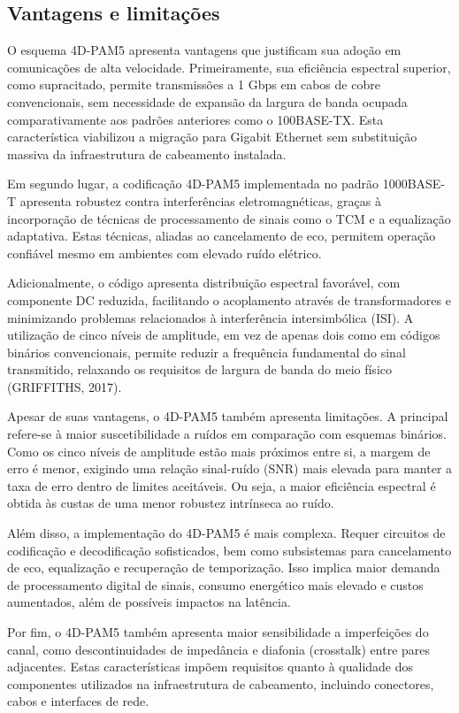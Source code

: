 \documentclass[conference]{IEEEtran}
\begin{document}
\subsection{Vantagens e limitações}

O esquema 4D-PAM5 apresenta vantagens que justificam sua adoção em comunicações de alta velocidade. Primeiramente, sua eficiência espectral superior, como supracitado, permite transmissões a 1 Gbps em cabos de cobre convencionais, sem necessidade de expansão da largura de banda ocupada comparativamente aos padrões anteriores como o 100BASE-TX. Esta característica viabilizou a migração para Gigabit Ethernet sem substituição massiva da infraestrutura de cabeamento instalada.

Em segundo lugar, a codificação 4D-PAM5 implementada no padrão 1000BASE-T apresenta robustez contra interferências eletromagnéticas, graças à incorporação de técnicas de processamento de sinais como o TCM e a equalização adaptativa. Estas técnicas, aliadas ao cancelamento de eco, permitem operação confiável mesmo em ambientes com elevado ruído elétrico.

Adicionalmente, o código apresenta distribuição espectral favorável, com componente DC reduzida, facilitando o acoplamento através de transformadores e minimizando problemas relacionados à interferência intersimbólica (ISI). A utilização de cinco níveis de amplitude, em vez de apenas dois como em códigos binários convencionais, permite reduzir a frequência fundamental do sinal transmitido, relaxando os requisitos de largura de banda do meio físico (GRIFFITHS, 2017).

Apesar de suas vantagens, o 4D-PAM5 também apresenta limitações. A principal refere-se à maior suscetibilidade a ruídos em comparação com esquemas binários. Como os cinco níveis de amplitude estão mais próximos entre si, a margem de erro é menor, exigindo uma relação sinal-ruído (SNR) mais elevada para manter a taxa de erro dentro de limites aceitáveis. Ou seja, a maior eficiência espectral é obtida às custas de uma menor robustez intrínseca ao ruído.

Além disso, a implementação do 4D-PAM5 é mais complexa. Requer circuitos de codificação e decodificação sofisticados, bem como subsistemas para cancelamento de eco, equalização e recuperação de temporização. Isso implica maior demanda de processamento digital de sinais, consumo energético mais elevado e custos aumentados, além de possíveis impactos na latência.

Por fim, o 4D-PAM5 também apresenta maior sensibilidade a imperfeições do canal, como descontinuidades de impedância e diafonia (crosstalk) entre pares adjacentes. Estas características impõem requisitos quanto à qualidade dos componentes utilizados na infraestrutura de cabeamento, incluindo conectores, cabos e interfaces de rede.
\end{document}
